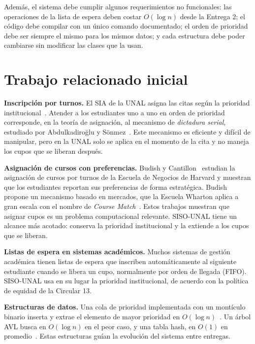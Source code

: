 \documentclass[conference]{IEEEtran}
\begin{document}
Además, el sistema debe cumplir algunos requerimientos no funcionales: las operaciones de la lista de espera deben costar $O(\log n)$ desde la Entrega 2; el código debe compilar con un único comando documentado; el orden de prioridad debe ser siempre el mismo para los mismos datos; y cada estructura debe poder cambiarse sin modificar las clases que la usan.


\section{Trabajo relacionado inicial}

\textbf{Inscripción por turnos.} El SIA de la UNAL asigna las citas según la prioridad institucional~\cite{circular13}. Atender a los estudiantes uno a uno en orden de prioridad corresponde, en la teoría de asignación, al mecanismo de \emph{dictadura serial}, estudiado por Abdulkadiroğlu y Sönmez~\cite{abdulkadiroglu1998}. Este mecanismo es eficiente y difícil de manipular, pero en la UNAL solo se aplica en el momento de la cita y no maneja los cupos que se liberan después.

\textbf{Asignación de cursos con preferencias.} Budish y Cantillon~\cite{budish2012} estudian la asignación de cursos por turnos de la Escuela de Negocios de Harvard y muestran que los estudiantes reportan sus preferencias de forma estratégica. Budish~\cite{budish2011} propone un mecanismo basado en mercados, que la Escuela Wharton aplica a gran escala con el nombre de \emph{Course Match}~\cite{budish2017}. Estos trabajos muestran que asignar cupos es un problema computacional relevante. SISO-UNAL tiene un alcance más acotado: conserva la prioridad institucional y la extiende a los cupos que se liberan.

\textbf{Listas de espera en sistemas académicos.} Muchos sistemas de gestión académica tienen listas de espera que inscriben automáticamente al siguiente estudiante cuando se libera un cupo, normalmente por orden de llegada (FIFO). SISO-UNAL usa en su lugar la prioridad institucional, de acuerdo con la política de equidad de la Circular 13.

\textbf{Estructuras de datos.} Una cola de prioridad implementada con un montículo binario inserta y extrae el elemento de mayor prioridad en $O(\log n)$~\cite{cormen}. Un árbol AVL busca en $O(\log n)$ en el peor caso, y una tabla hash, en $O(1)$ en promedio~\cite{cormen,goodrich}. Estas estructuras guían la evolución del sistema entre entregas.
\end{document}
